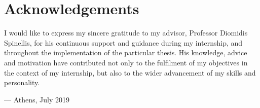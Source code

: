\chapter*{\centering Acknowledgements}

I would like to express my sincere gratitude
to my advisor, Professor Diomidis Spinellis,
for his continuous support and guidance
during my internship,
and throughout the implementation
of the particular thesis.
His knowledge, advice and motivation
have contributed not only to the fulfilment
of my objectives in the context of my internship,
but also to the wider advancement of my skills and personality.

\vspace{1cm}

\hfill --- Athens, July 2019
